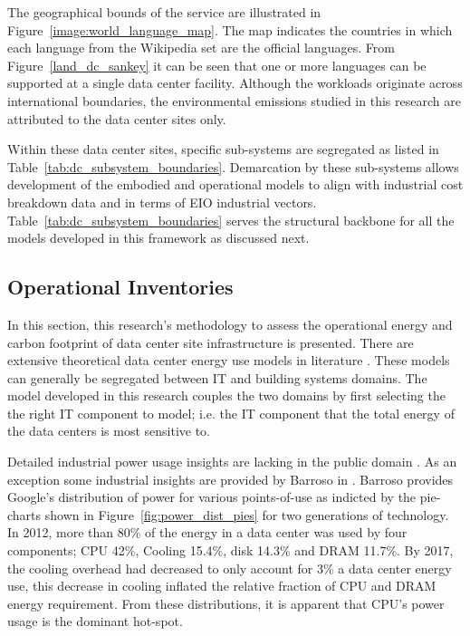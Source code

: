     
    
    The geographical bounds of the service are illustrated in Figure~\ref{image:world_language_map}. The map indicates the countries in which each language from the Wikipedia set are the official languages. From  Figure~\ref{land_dc_sankey} it can be seen that one or more languages can be supported at a single data center facility. Although the workloads originate across international boundaries, the environmental emissions studied in this research are attributed to the data center sites only.  
    
    
    
    Within these data center sites, specific sub-systems are segregated as listed in Table~\ref{tab:dc_subsystem_boundaries}. Demarcation by these sub-systems allows development of the embodied and operational models to align with industrial cost breakdown data and in terms of EIO industrial vectors. Table~\ref{tab:dc_subsystem_boundaries} serves the structural backbone for all the models developed in this framework as discussed next.
    
    
    
    \subsection{Operational Inventories}
    
    
    In this section, this research's methodology to assess the operational energy and carbon footprint of data center site infrastructure is presented. There are extensive theoretical data center energy use models in literature \cite{dayarathna16, joshi12}. These models can generally be segregated between IT and building systems domains. The model developed in this research couples the two domains by first selecting the the right IT component to model; i.e. the IT component that the total energy of the data centers is most sensitive to.
    
    Detailed industrial power usage insights are lacking in the public domain \cite{Masanet20}. As an exception some industrial insights are provided by Barroso in \cite{barroso18, barroso13}. Barroso provides Google's distribution of power for various points-of-use as indicted by the pie-charts shown in Figure~\ref{fig:power_dist_pies} for two generations of technology. In 2012, more than 80\% of the energy in a data center was used by four components; CPU 42\%, Cooling 15.4\%, disk 14.3\% and DRAM 11.7\%. By 2017, the cooling overhead had decreased to only account for 3\% a data center energy use, this decrease in cooling inflated the relative fraction of CPU and DRAM energy requirement. From these distributions, it is apparent that CPU's power usage is the dominant hot-spot.  
    
